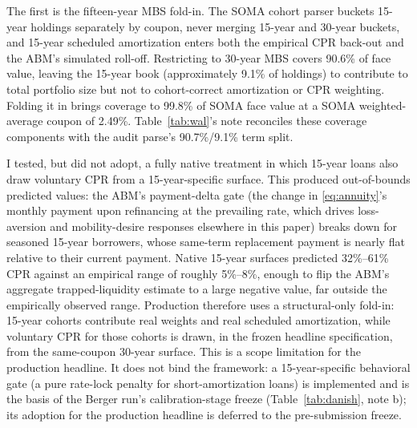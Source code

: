 \documentclass[12pt]{article}
\begin{document}
The first is the fifteen-year MBS fold-in. The SOMA cohort parser buckets 15-year holdings separately by coupon, never merging 15-year and 30-year buckets, and 15-year scheduled amortization enters both the empirical CPR back-out and the ABM's simulated roll-off. Restricting to 30-year MBS covers 90.6\% of face value, leaving the 15-year book (approximately 9.1\% of holdings) to contribute to total portfolio size but not to cohort-correct amortization or CPR weighting. Folding it in brings coverage to 99.8\% of SOMA face value at a SOMA weighted-average coupon of 2.49\%. Table~\ref{tab:wal}'s note reconciles these coverage components with the audit parse's 90.7\%/9.1\% term split.

I tested, but did not adopt, a fully native treatment in which 15-year loans also draw voluntary CPR from a 15-year-specific surface. This produced out-of-bounds predicted values: the ABM's payment-delta gate (the change in \eqref{eq:annuity}'s monthly payment upon refinancing at the prevailing rate, which drives loss-aversion and mobility-desire responses elsewhere in this paper) breaks down for seasoned 15-year borrowers, whose same-term replacement payment is nearly flat relative to their current payment. Native 15-year surfaces predicted 32\%--61\% CPR against an empirical range of roughly 5\%--8\%, enough to flip the ABM's aggregate trapped-liquidity estimate to a large negative value, far outside the empirically observed range. Production therefore uses a structural-only fold-in: 15-year cohorts contribute real weights and real scheduled amortization, while voluntary CPR for those cohorts is drawn, in the frozen headline specification, from the same-coupon 30-year surface. This is a scope limitation for the production headline. It does not bind the framework: a 15-year-specific behavioral gate (a pure rate-lock penalty for short-amortization loans) is implemented and is the basis of the Berger run's calibration-stage freeze (Table~\ref{tab:danish}, note b); its adoption for the production headline is deferred to the pre-submission freeze.
\end{document}
